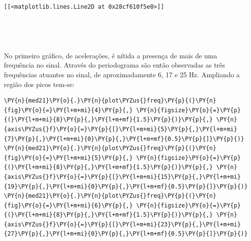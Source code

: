             \begin{tcolorbox}[breakable, size=fbox, boxrule=.5pt, pad at break*=1mm, opacityfill=0]
\begin{Verbatim}[commandchars=\\\{\}]
[[<matplotlib.lines.Line2D at 0x28cf610f5e0>]]
\end{Verbatim}
\end{tcolorbox}
        
    \begin{center}
    \end{center}
    { \hspace*{\fill} \\}
    
    \begin{center}
    \end{center}
    { \hspace*{\fill} \\}
    
    No primeiro gráfico, de acelerações, é nítida a presença de mais de uma
frequência no sinal. Através do periodograma são então observadas as
três frequências atuantes no sinal, de aproximadamente 6, 17 e 25 Hz.
Ampliando a região dos picos tem-se:

    \begin{tcolorbox}[breakable, size=fbox, boxrule=1pt, pad at break*=1mm,colback=cellbackground, colframe=cellborder]
\begin{Verbatim}[commandchars=\\\{\}]
\PY{n}{med21}\PY{o}{.}\PY{n}{plot\PYZus{}freq}\PY{p}{(}\PY{n}{fig}\PY{o}{=}\PY{l+m+mi}{4}\PY{p}{,} \PY{n}{figsize}\PY{o}{=}\PY{p}{(}\PY{l+m+mi}{8}\PY{p}{,}\PY{l+m+mf}{1.5}\PY{p}{)}\PY{p}{,} \PY{n}{axis\PYZus{}f}\PY{o}{=}\PY{p}{[}\PY{l+m+mi}{5}\PY{p}{,}\PY{l+m+mi}{7}\PY{p}{,}\PY{l+m+mi}{0}\PY{p}{,}\PY{l+m+mf}{0.5}\PY{p}{]}\PY{p}{)}
\PY{n}{med21}\PY{o}{.}\PY{n}{plot\PYZus{}freq}\PY{p}{(}\PY{n}{fig}\PY{o}{=}\PY{l+m+mi}{5}\PY{p}{,} \PY{n}{figsize}\PY{o}{=}\PY{p}{(}\PY{l+m+mi}{8}\PY{p}{,}\PY{l+m+mf}{1.5}\PY{p}{)}\PY{p}{,} \PY{n}{axis\PYZus{}f}\PY{o}{=}\PY{p}{[}\PY{l+m+mi}{15}\PY{p}{,}\PY{l+m+mi}{19}\PY{p}{,}\PY{l+m+mi}{0}\PY{p}{,}\PY{l+m+mf}{0.5}\PY{p}{]}\PY{p}{)}
\PY{n}{med21}\PY{o}{.}\PY{n}{plot\PYZus{}freq}\PY{p}{(}\PY{n}{fig}\PY{o}{=}\PY{l+m+mi}{6}\PY{p}{,} \PY{n}{figsize}\PY{o}{=}\PY{p}{(}\PY{l+m+mi}{8}\PY{p}{,}\PY{l+m+mf}{1.5}\PY{p}{)}\PY{p}{,} \PY{n}{axis\PYZus{}f}\PY{o}{=}\PY{p}{[}\PY{l+m+mi}{23}\PY{p}{,}\PY{l+m+mi}{27}\PY{p}{,}\PY{l+m+mi}{0}\PY{p}{,}\PY{l+m+mf}{0.5}\PY{p}{]}\PY{p}{)}
\end{Verbatim}
\end{tcolorbox}

